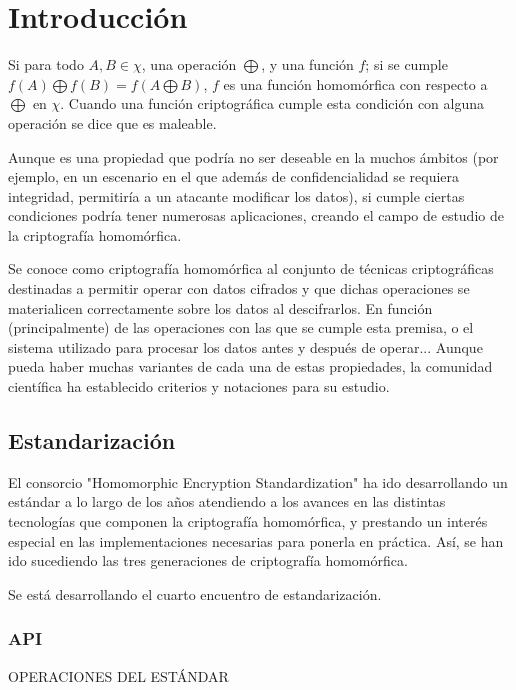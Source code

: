 \chapter{Introducción}

Si para todo $ A,B \in \chi{} $, una operación $ \bigoplus $, y una función $f$; si se cumple $ f(A) \bigoplus f(B) = f(A \bigoplus B)$, $ f $ es una función homomórfica con respecto a $ \bigoplus $ en $ \chi{} $. Cuando una función criptográfica cumple esta condición con alguna operación se dice que es maleable\cite{non-malleable-dolev}. 

Aunque es una propiedad que podría no ser deseable en la muchos ámbitos (por ejemplo, en un escenario en el que además de confidencialidad se requiera integridad, permitiría a un atacante modificar los datos), si cumple ciertas condiciones podría tener numerosas aplicaciones, creando el campo de estudio de la criptografía homomórfica.

Se conoce como criptografía homomórfica al conjunto de técnicas criptográficas destinadas a permitir operar con datos cifrados y que dichas operaciones se materialicen correctamente sobre los datos al descifrarlos. En función (principalmente) de las operaciones con las que se cumple esta premisa, o el sistema utilizado para procesar los datos antes y después de operar... Aunque pueda haber muchas variantes de cada una de estas propiedades, la comunidad científica ha establecido criterios y notaciones para su estudio. 

\section{Estandarización}

El consorcio "Homomorphic Encryption Standardization"\cite{noauthor_homomorphic_nodate-1} ha ido desarrollando un estándar a lo largo de los años atendiendo a los avances en las distintas tecnologías que componen la criptografía homomórfica, y prestando un interés especial en las implementaciones necesarias para ponerla en práctica. Así, se han ido sucediendo las tres generaciones de criptografía homomórfica.

Se está desarrollando el cuarto encuentro de estandarización.


\subsection{API}

OPERACIONES DEL ESTÁNDAR


